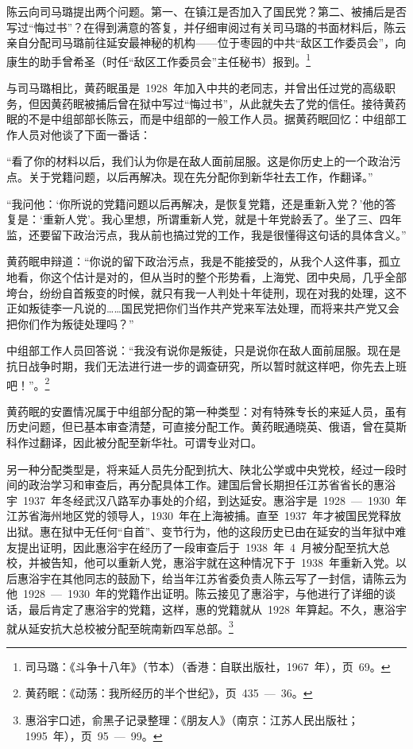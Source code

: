 陈云向司马璐提出两个问题。第一、在镇江是否加入了国民党？第二、被捕后是否写过“悔过书”？在得到满意的答复，并仔细审阅过有关司马璐的书面材料后，陈云亲自分配司马璐前往延安最神秘的机构——位于枣园的中共“敌区工作委员会”，向康生的助手曾希圣（时任“敌区工作委员会”主任秘书）报到。\footnote{司马璐：《斗争十八年》（节本）（香港：自联出版社，1967~年），页~69。}

与司马璐相比，黄药眠虽是~1928~年加入中共的老同志，并曾出任过党的高级职务，但因黄药眠被捕后曾在狱中写过“悔过书”，从此就失去了党的信任。接待黄药眠的不是中组部部长陈云，而是中组部的一般工作人员。据黄药眠回忆：中组部工作人员对他谈了下面一番话：

“看了你的材料以后，我们认为你是在敌人面前屈服。这是你历史上的一个政治污点。关于党籍问题，以后再解决。现在先分配你到新华社去工作，作翻译。”

“我问他：‘你所说的党籍问题以后再解决，是恢复党籍，还是重新入党？’他的答复是：‘重新人党’。我心里想，所谓重新人党，就是十年党龄丢了。坐了三、四年监，还要留下政治污点，我从前也搞过党的工作，我是很懂得这句话的具体含义。”

黄药眠申辩道：“你说的留下政治污点，我是不能接受的，从我个人这件事，孤立地看，你这个估计是对的，但从当时的整个形势看，上海党、团中央局，几乎全部垮台，纷纷自首叛变的时候，就只有我一人判处十年徒刑，现在对我的处理，这不正如叛徒李一凡说的……国民党把你们当作共产党来军法处理，而将来共产党又会把你们作为叛徒处理吗？”

中组部工作人员回答说：“我没有说你是叛徒，只是说你在敌人面前屈服。现在是抗日战争时期，我们无法进行进一步的调查研究，所以暂时就这样吧，你先去上班吧！”。\footnote{黄药眠：《动荡：我所经历的半个世纪》，页~435~—~36。}

黄药眠的安置情况属于中组部分配的第一种类型：对有特殊专长的来延人员，虽有历史问题，但已基本审查清楚，可直接分配工作。黄药眠通晓英、俄语，曾在莫斯科作过翻译，因此被分配至新华社。可谓专业对口。

另一种分配类型是，将来延人员先分配到抗大、陕北公学或中央党校，经过一段时间的政治学习和审查后，再分配具体工作。建国后曾长期担任江苏省省长的惠浴宇~1937~年冬经武汉八路军办事处的介绍，到达延安。惠浴宇是~1928~—~1930~年江苏省海州地区党的领导人，1930~年在上海被捕。直至~1937~年才被国民党释放出狱。惠在狱中无任何“自首”、变节行为，他的这段历史已由在延安的当年狱中难友提出证明，因此惠浴宇在经历了一段审查后于~1938~年~4~月被分配至抗大总校，并被告知，他可以重新人党，惠浴宇就在这种情况下于~1938~年重新入党。以后惠浴宇在其他同志的鼓励下，给当年江苏省委负责人陈云写了一封信，请陈云为他~1928~—~1930~年的党籍作出证明。陈云接见了惠浴宇，与他进行了详细的谈话，最后肯定了惠浴宇的党籍，这样，惠的党籍就从~1928~年算起。不久，惠浴宇就从延安抗大总校被分配至皖南新四军总部。\footnote{惠浴宇口述，俞黑子记录整理：《朋友人》（南京：江苏人民出版社；1995~年），页~95~—~99。}

